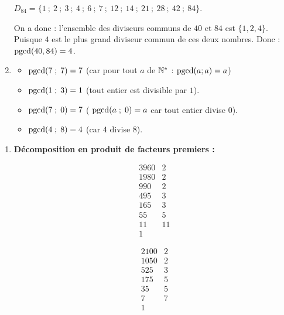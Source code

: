 \documentclass[10pt, a4paper]{article}
\begin{document}
\begin{multicols*}{2}
\begin{Solution}[APPLICATION][11]
\begin{enumerate}[leftmargin=*,itemsep=0.5pt]
    $D_{84} = \big\{1~;~2~;~3~;~4~;~6~;~7~;~12~;~14~;~21~;~28~;~42~;~84\big\}$.

    On a donc : l'ensemble des diviseurs communs de $40$ et $84$ est $\big\{1, 2, 4\big\}$. \\
    Puisque $4$ est le plus grand diviseur commun de ces deux nombres. 
    Donc : \quad $\pgcd(40, 84) = 4$.

    \item
    \begin{itemize}[leftmargin=*,itemsep=0.5pt]
        \item $\operatorname{pgcd}(7 \; ; \; 7) = 7$ \quad
        (car pour tout $a$ de $\mathbb{N}^*$ : $\operatorname{pgcd}(a ; a) = a$)
        \item $\operatorname{pgcd}(1 \; ; \; 3) = 1$ \quad (tout entier est divisible par $1$).
        \item $\operatorname{pgcd}(7 \; ; \; 0) = 7$ \quad ( $\operatorname{pgcd}(a \; ; \; 0) = a$ car tout entier divise $0$).
        \item $\operatorname{pgcd}(4 \; ; \; 8) = 4$ \quad (car $4$ divise $8$).
    \end{itemize}
\end{enumerate}
\end{Solution}

\begin{Solution}[APPLICATION][12]
\begin{enumerate}[leftmargin=*,itemsep=0.5pt]
    \item \textbf{Décomposition en produit de facteurs premiers :}
    \begin{multicols}{2}
    \[
    \begin{array}{r|l}
    3960 & 2 \\
    1980 & 2 \\
    990  & 2 \\
    495  & 3 \\
    165  & 3 \\
    55   & 5 \\
    11   & 11 \\
    1    &
    \end{array}
    \]

    \columnbreak

    \[
    \begin{array}{r|l}
    2100 & 2 \\
    1050 & 2 \\
    525  & 3 \\
    175  & 5 \\
    35   & 5 \\
    7    & 7 \\
    1    &
    \end{array}
    \]


\end{multicols}
\end{enumerate}
\end{Solution}
\end{multicols*}
\end{document}
